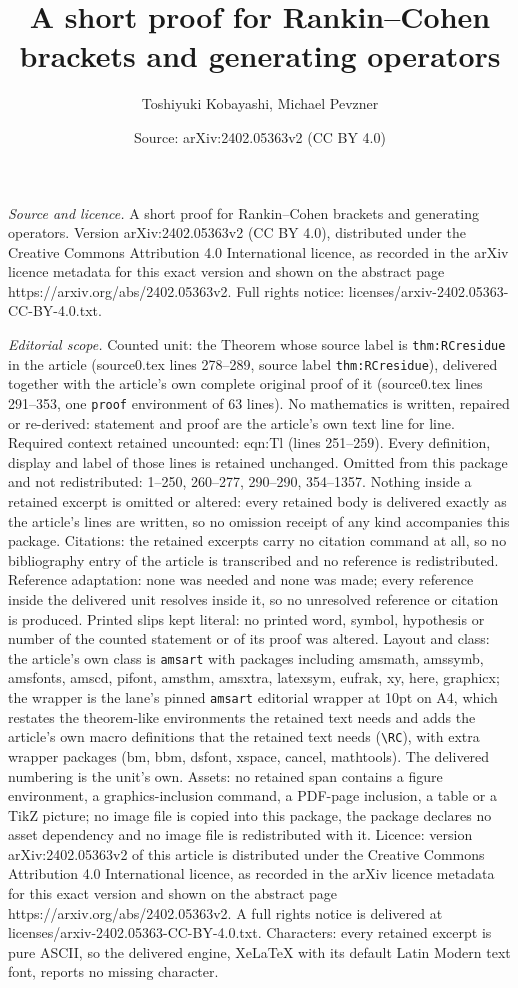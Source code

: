 \documentclass[10pt,a4paper]{amsart}
\title[A short proof for Rankin--Cohen brackets and generating oper]{A short proof for Rankin--Cohen brackets and generating operators}
\author{Toshiyuki Kobayashi, Michael Pevzner}
\date{Source: arXiv:2402.05363v2 (CC BY 4.0)}
\begin{document}
\maketitle

\noindent\emph{Source and licence.} A short proof for Rankin--Cohen brackets and generating operators. Version arXiv:2402.05363v2 (CC BY 4.0), distributed under the Creative Commons Attribution 4.0 International licence, as recorded in the arXiv licence metadata for this exact version and shown on the abstract page https://arxiv.org/abs/2402.05363v2. Full rights notice: licenses/arxiv-2402.05363-CC-BY-4.0.txt.\par\smallskip

\noindent\textit{Editorial scope.} Counted unit: the Theorem whose source label is \texttt{thm:RCresidue} in the article (source0.tex lines 278--289, source label \texttt{thm:RCresidue}), delivered together with the article's own complete original proof of it (source0.tex lines 291--353, one \texttt{proof} environment of 63 lines). No mathematics is written, repaired or re-derived: statement and proof are the article's own text line for line. Required context retained uncounted: eqn:Tl (lines 251--259). Every definition, display and label of those lines is retained unchanged. Omitted from this package and not redistributed: 1--250, 260--277, 290--290, 354--1357. Nothing inside a retained excerpt is omitted or altered: every retained body is delivered exactly as the article's lines are written, so no omission receipt of any kind accompanies this package. Citations: the retained excerpts carry no citation command at all, so no bibliography entry of the article is transcribed and no reference is redistributed. Reference adaptation: none was needed and none was made; every reference inside the delivered unit resolves inside it, so no unresolved reference or citation is produced. Printed slips kept literal: no printed word, symbol, hypothesis or number of the counted statement or of its proof was altered. Layout and class: the article's own class is \texttt{amsart} with packages including amsmath, amssymb, amsfonts, amscd, pifont, amsthm, amsxtra, latexsym, eufrak, xy, here, graphicx; the wrapper is the lane's pinned \texttt{amsart} editorial wrapper at 10pt on A4, which restates the theorem-like environments the retained text needs and adds the article's own macro definitions that the retained text needs (\texttt{\textbackslash RC}), with extra wrapper packages (bm, bbm, dsfont, xspace, cancel, mathtools). The delivered numbering is the unit's own. Assets: no retained span contains a figure environment, a graphics-inclusion command, a PDF-page inclusion, a table or a TikZ picture; no image file is copied into this package, the package declares no asset dependency and no image file is redistributed with it. Licence: version arXiv:2402.05363v2 of this article is distributed under the Creative Commons Attribution 4.0 International licence, as recorded in the arXiv licence metadata for this exact version and shown on the abstract page https://arxiv.org/abs/2402.05363v2. A full rights notice is delivered at licenses/arxiv-2402.05363-CC-BY-4.0.txt. Characters: every retained excerpt is pure ASCII, so the delivered engine, XeLaTeX with its default Latin Modern text font, reports no missing character.
\end{document}
